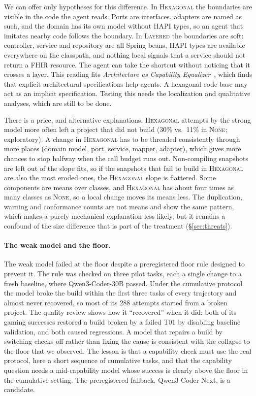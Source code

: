 \documentclass[10pt]{article}
\newcommand{\NONE}{\textsc{None}}
\newcommand{\LAY}{\textsc{Layered}}
\newcommand{\HEX}{\textsc{Hexagonal}}
\begin{document}
We can offer only hypotheses for this difference. In \HEX{} the boundaries are visible in the code
the agent reads. Ports are interfaces, adapters are named as such, and the domain has its own model
without HAPI types, so an agent that imitates nearby code follows the boundary. In \LAY{} the
boundaries are soft: controller, service and repository are all Spring beans, HAPI types are
available everywhere on the classpath, and nothing local signals that a service should not return
a FHIR resource. The agent can take the shortcut without noticing that it crosses a layer. This
reading fits \emph{Architecture as Capability Equalizer}~\citep{archequalizer2026}, which finds
that explicit architectural specifications help agents. A hexagonal code base may act as an
implicit specification. Testing this needs the localization and qualitative analyses, which are
still to be done.

There is a price, and alternative explanations. \HEX{} attempts by the strong model more often left
a project that did not build (30\% vs.\ 11\% in \NONE; exploratory). A change in \HEX{} has to be
threaded consistently through more places (domain model, port, service, mapper, adapter), which
gives more chances to stop halfway when the call budget runs out. Non-compiling snapshots are left
out of the slope fits, so if the snapshots that fail to build in \HEX{} are also the most eroded
ones, the \HEX{} slope is flattered. Some components are means over classes, and \HEX{} has about
four times as many classes as \NONE, so a local change moves its means less. The duplication,
warning and conformance counts are not means and show the same pattern, which makes a purely
mechanical explanation less likely, but it remains a confound of the size difference that is part
of the treatment (\S\ref{sec:threats}).

\paragraph{The weak model and the floor.} The weak model failed at the floor despite a preregistered
floor rule designed to prevent it. The rule was checked
on three pilot tasks, each a single change to a fresh baseline, where Qwen3-Coder-30B passed. Under
the cumulative protocol the model broke the build within the first three tasks of every trajectory
and almost never recovered, so most of its 288 attempts started from a broken project. The quality
review shows how it ``recovered'' when it did: both of its gaming successes restored a build broken
by a failed T01 by disabling baseline validation, and both caused regressions. A model that repairs a
build by switching checks off rather than fixing the cause is consistent with the collapse to the
floor that we observed. The lesson
is that a capability check must use the real protocol, here a short sequence of cumulative tasks,
and that the capability question needs a mid-capability model whose success is clearly above the
floor in the cumulative setting. The preregistered fallback, Qwen3-Coder-Next, is a candidate.
\end{document}
